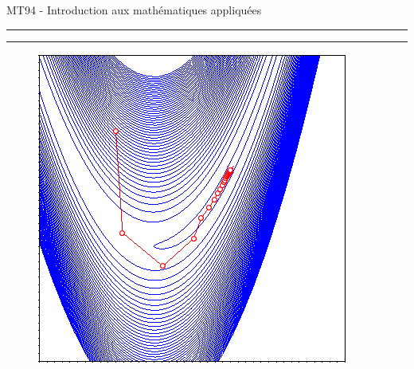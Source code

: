\thispagestyle{firstpage}
\setcounter{page}{0}
\begin{center}
    \vspace*{1cm}
    \Large {MT94 - Introduction aux mathématiques appliquées}
    {\rule{\linewidth}{0.4mm}\vspace{0.4cm}}
    \Huge{\textbf{\thetitle}}
    {\rule{\linewidth}{0.4mm}\vspace{0.4cm}}
    \begin{flushright}
    \Large{\theauthor}
    \end{flushright}
\end{center}
 \begin{figure}[H]
        \centering
        \begin{minipage}[H]{0.42\textwidth}
            \includegraphics[width=\textwidth]{images/LM1acceuil.png}
        \end{minipage}
        \hfill
        \begin{minipage}[H]{0.42\textwidth}

\end{minipage}
\end{figure}
